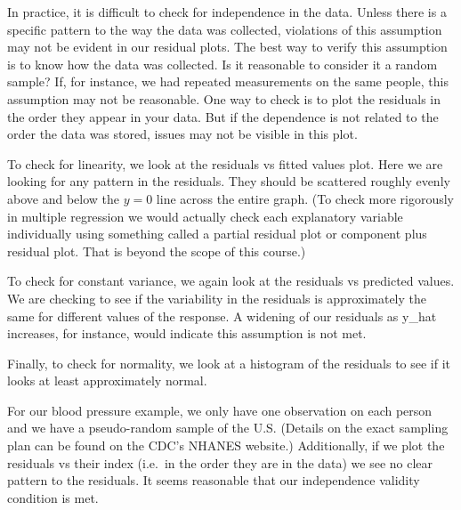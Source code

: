 \documentclass[]{book}
\newenvironment{Shaded}{\begin{snugshade}}{\end{snugshade}}
\newcommand{\DecValTok}[1]{\textcolor[rgb]{0.00,0.00,0.81}{#1}}
\newcommand{\KeywordTok}[1]{\textcolor[rgb]{0.13,0.29,0.53}{\textbf{#1}}}
\newcommand{\NormalTok}[1]{#1}
\newcommand{\OperatorTok}[1]{\textcolor[rgb]{0.81,0.36,0.00}{\textbf{#1}}}
\begin{document}
In practice, it is difficult to check for independence in the data. Unless there is a specific pattern to the way the data was collected, violations of this assumption may not be evident in our residual plots. The best way to verify this assumption is to know how the data was collected. Is it reasonable to consider it a random sample? If, for instance, we had repeated measurements on the same people, this assumption may not be reasonable. One way to check is to plot the residuals in the order they appear in your data. But if the dependence is not related to the order the data was stored, issues may not be visible in this plot.

To check for linearity, we look at the residuals vs fitted values plot. Here we are looking for any pattern in the residuals. They should be scattered roughly evenly above and below the \(y=0\) line across the entire graph. (To check more rigorously in multiple regression we would actually check each explanatory variable individually using something called a partial residual plot or component plus residual plot. That is beyond the scope of this course.)

To check for constant variance, we again look at the residuals vs predicted values. We are checking to see if the variability in the residuals is approximately the same for different values of the response. A widening of our residuals as y\_hat increases, for instance, would indicate this assumption is not met.

Finally, to check for normality, we look at a histogram of the residuals to see if it looks at least approximately normal.

For our blood pressure example, we only have one observation on each person and we have a pseudo-random sample of the U.S. (Details on the exact sampling plan can be found on the CDC's NHANES website.) Additionally, if we plot the residuals vs their index (i.e.~in the order they are in the data) we see no clear pattern to the residuals. It seems reasonable that our independence validity condition is met.

\begin{Shaded}
\end{Shaded}
\end{document}
